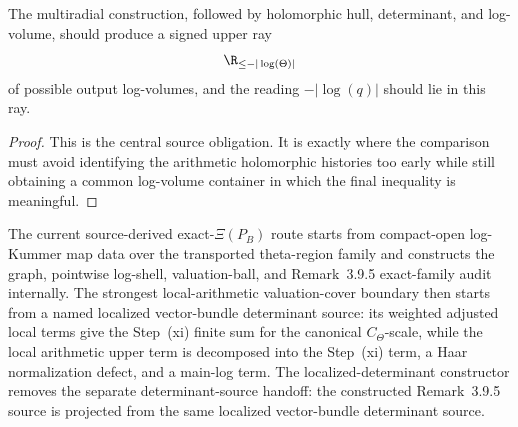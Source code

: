 \begin{proposition}
  \label{prop:step-xi-upper-ray-input}
  \notready
  The multiradial construction, followed by holomorphic hull, determinant, and
  log-volume, should produce a signed upper ray
  \[
    \R_{\le -|\log(\Theta)|}
  \]
  of possible output log-volumes, and the \qPilot{} reading
  \(-|\log(q)|\) should lie in this ray.
\end{proposition}

\begin{proof}
  This is the central source obligation.  It is exactly where the comparison
  must avoid identifying the arithmetic holomorphic histories too early while
  still obtaining a common log-volume container in which the final inequality
  is meaningful.
\end{proof}

\begin{proposition}
  \label{prop:localized-step-xi-ctheta-source}
  \leanok
  The current source-derived exact-\(\Xi(P_B)\) route starts from compact-open
  log-Kummer map data over the transported theta-region family and constructs
  the graph, pointwise log-shell, valuation-ball, and Remark~3.9.5
  exact-family audit internally.  The strongest local-arithmetic
  valuation-cover boundary then starts from a named localized vector-bundle
  determinant source: its weighted adjusted local terms give the Step~(xi)
  finite sum for the canonical \(C_\Theta\)-scale, while the local arithmetic
  upper term is decomposed into the Step~(xi) term, a Haar normalization
  defect, and a main-log term.  The localized-determinant constructor removes
  the separate determinant-source handoff: the constructed Remark~3.9.5 source
  is projected from the same localized vector-bundle determinant source.
\end{proposition}

